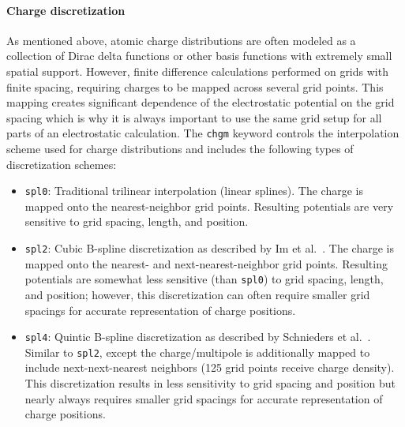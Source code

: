 \documentclass[12pt,titlepage]{article}
\newcommand{\keyword}[1]{\texttt{#1}}
\newcommand{\revision}[1]{#1}
\begin{document}
\paragraph{Charge discretization}
As mentioned above, atomic charge distributions are often modeled as a collection of Dirac delta functions or other basis functions with extremely small spatial support.
However, finite difference calculations \revision{performed} on grids with finite spacing, requiring charges to be mapped across several grid points.
This mapping creates significant dependence of the electrostatic potential on the grid spacing which is why it is always important to use the same grid setup for all parts of an electrostatic calculation.
The \keyword{chgm} keyword controls the interpolation scheme used for charge distributions and includes the following types of discretization schemes:
\begin{itemize}
	\item \keyword{spl0}: Traditional trilinear interpolation (linear splines).
	The charge is mapped onto the nearest-neighbor grid points.
	Resulting potentials are very sensitive to grid spacing, length, and position.
	\item \keyword{spl2}: Cubic B-spline discretization as described by Im et al.~\cite{IBR98}.
	The charge is mapped onto the nearest- and next-nearest-neighbor grid points.
	Resulting potentials are somewhat less sensitive (than \keyword{spl0}) to grid spacing, length, and position; however, this discretization can often require smaller grid spacings for accurate representation of charge positions.
	\item \keyword{spl4}: Quintic B-spline discretization as described by Schnieders et al.~\cite{Schnieders2007}.
	Similar to \keyword{spl2}, except the charge/multipole is additionally mapped to include next-next-nearest neighbors (125 grid points receive charge density).
	This discretization results in less sensitivity to grid spacing and position but nearly always requires smaller grid spacings for accurate representation of charge positions.
\end{itemize}
\end{document}
